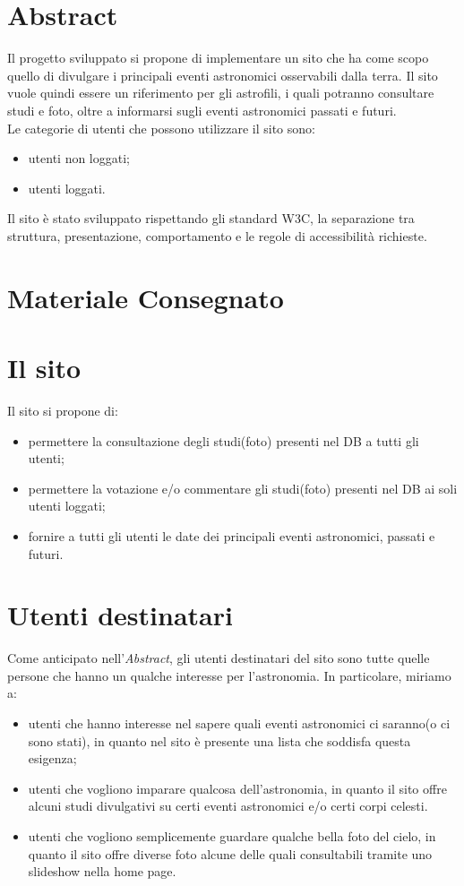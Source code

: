 	
	\section{Abstract}
	Il progetto sviluppato si propone di implementare un sito che ha come scopo quello di divulgare i principali eventi astronomici osservabili dalla terra.
	Il sito vuole quindi essere un riferimento per gli astrofili, i quali potranno consultare studi e foto, oltre a informarsi sugli eventi astronomici passati e futuri. \\
	Le categorie di utenti che possono utilizzare il sito sono:
	\begin{itemize}
	\item utenti non loggati;
	\item utenti loggati.
	\end{itemize}
	Il sito è stato sviluppato rispettando gli
	standard W3C, la separazione tra struttura, presentazione, comportamento
	e le regole di accessibilità richieste.
	
	\section{Materiale Consegnato}
	\section{Il sito}
	
	Il sito si propone di:
	\begin{itemize}
		\item permettere la consultazione degli studi(foto) presenti nel DB a tutti gli utenti;
		\item permettere la votazione e/o commentare gli studi(foto) presenti nel DB ai soli utenti loggati;
		\item fornire a tutti gli utenti le date dei principali eventi astronomici, passati e futuri.
	\end{itemize}
	\section{Utenti destinatari}
	Come anticipato nell'\textit{Abstract}, gli utenti destinatari del sito sono tutte quelle persone che hanno un qualche interesse per l'astronomia.
	In particolare, miriamo a:
	\begin{itemize}
		\item utenti che hanno interesse nel sapere quali eventi astronomici ci saranno(o ci sono stati), in quanto nel sito è presente una lista che soddisfa questa esigenza;
		\item utenti che vogliono imparare qualcosa dell'astronomia, in quanto il sito offre alcuni studi divulgativi su certi eventi astronomici e/o certi corpi celesti.
		\item utenti che vogliono semplicemente guardare qualche bella foto del cielo, in quanto il sito offre diverse foto alcune delle quali consultabili tramite uno slideshow nella home page.
		
	\end{itemize}
